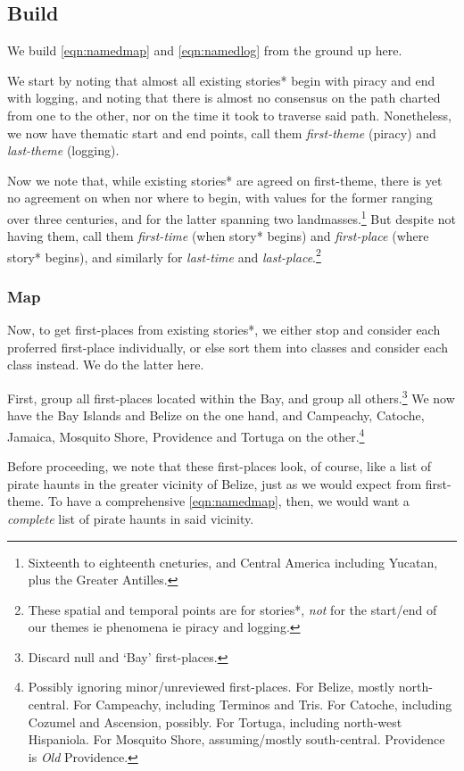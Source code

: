 \documentclass{amsart}
\newcommand{\mention}[1]{\textit{#1}} %
\theoremstyle{definition}
\theoremstyle{remark}
\begin{document}
	\subsection{Build}
	\label{ss:build}
		We build \ref{eqn:namedmap} and \ref{eqn:namedlog} from the ground up here.
		
		We start by noting that almost all existing stories* begin with piracy and end with logging, and noting that there is almost no consensus on the path charted from one to the other, nor on the time it took to traverse said path. Nonetheless, we now have thematic start and end points, call them \mention{first-theme} (piracy) and \mention{last-theme} (logging).
		
		Now we note that, while existing stories* are agreed on first-theme, there is yet no agreement on when nor where to begin, with values for the former ranging over three centuries, and for the latter spanning two landmasses.\footnote{Sixteenth to eighteenth cneturies, and Central America including Yucatan, plus the Greater Antilles.} But despite not having them, call them \mention{first-time} (when story* begins) and \mention{first-place} (where story* begins), and similarly for \mention{last-time} and \mention{last-place}.\footnote{These spatial and temporal points are for stories*, \emph{not} for the start/end of our themes ie phenomena ie piracy and logging.}
		\subsubsection{Map}
		\label{sss:map}
			Now, to get first-places from existing stories*, we either stop and consider each proferred first-place individually, or else sort them into classes and consider each class instead. We do the latter here.
		
			First, group all first-places located within the Bay, and group all others.\footnote{Discard null and `Bay' first-places.} We now have the Bay Islands and Belize on the one hand, and Campeachy, Catoche, Jamaica, Mosquito Shore, Providence and Tortuga on the other.\footnote{Possibly ignoring minor/unreviewed first-places. For Belize, mostly north-central. For Campeachy, including Terminos and Tris. For Catoche, including Cozumel and Ascension, possibly. For Tortuga, including north-west Hispaniola. For Mosquito Shore, assuming/mostly south-central. Providence is \emph{Old} Providence.}
		
			Before proceeding, we note that these first-places look, of course, like a list of pirate haunts in the greater vicinity of Belize, just as we would expect from first-theme. To have a comprehensive \ref{eqn:namedmap}, then, we would want a \emph{complete} list of pirate haunts in said vicinity.
		
\end{document}

